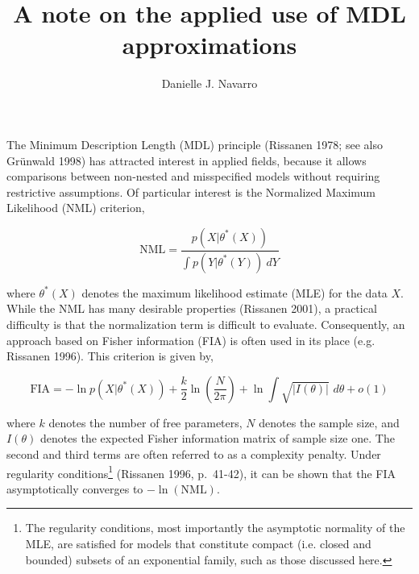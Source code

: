 \documentclass[doc,floatsintext]{apa6}
\title{A note on the applied use of MDL approximations}
\author{\normalsize Danielle J. Navarro}
\affiliation{Department of Psychology \\ Ohio State University}
\date{}
\begin{document}
\maketitle

\vspace*{10pt}
The Minimum Description Length (MDL) principle (Rissanen 1978; see also Gr\"{u}nwald 1998) has attracted interest in applied fields, because it allows comparisons between non-nested and misspecified models without requiring restrictive assumptions. Of particular interest is the Normalized Maximum Likelihood (NML) criterion,

\begin{displaymath}
\mbox{NML} = \frac{p(X|\theta^\ast(X))}{\int p(Y|\theta^\ast(Y)) \ dY}
\end{displaymath}

\noindent
where $\theta^\ast(X)$ denotes the maximum likelihood estimate (MLE) for the data $X$. While the NML has many desirable properties (Rissanen 2001), a practical difficulty is that the normalization term is difficult to evaluate. Consequently, an approach based on Fisher information (FIA) is often used in its place (e.g. Rissanen 1996). This criterion is given by,

\begin{displaymath}
\mbox{FIA} = -\ln p(X|\theta^\ast(X)) + \frac{k}{2} \ln \left(\frac{N}{2\pi}\right) + \ln \int \sqrt{|I(\theta)|} \,\, d\theta + o(1)
\end{displaymath}

\noindent
where $k$ denotes the number of free parameters, $N$ denotes the sample size, and $I(\theta)$ denotes the expected Fisher information matrix of sample size one. The second and third terms are often referred to as a complexity penalty. Under regularity conditions\footnote{ The regularity conditions, most importantly the asymptotic normality of the MLE, are satisfied for models that constitute compact (i.e. closed and bounded) subsets of an exponential family, such as those discussed here.}  (Rissanen 1996, p.\ 41-42), it can be shown that the FIA asymptotically converges to $-\ln(\mbox{NML})$. %

\end{document}
